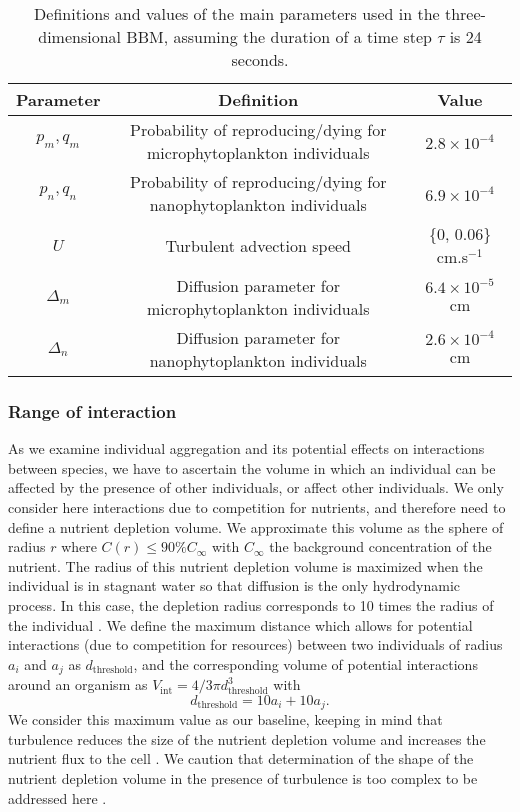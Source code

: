 \documentclass[12pt,english]{article}
\providecommand{\tabularnewline}{\\}
\begin{document}
\begin{table}[H]
\begin{centering}
\begin{tabular}{|c|c|c|}
\hline 
Parameter  & Definition  & Value\tabularnewline
\hline 
$p_{m},q_{m}$  & Probability of reproducing/dying for microphytoplankton individuals  & $2.8\times10^{-4}$\tabularnewline
$p_{n},q_{n}$  & Probability of reproducing/dying for nanophytoplankton individuals  & $6.9\times10^{-4}$\tabularnewline
$U$  & Turbulent advection speed  & \{0, 0.06\} cm.s$^{-1}$\tabularnewline
$\Delta_{m}$  & Diffusion parameter for microphytoplankton individuals  & $6.4\times10^{-5}$ cm\tabularnewline
$\Delta_{n}$  & Diffusion parameter for nanophytoplankton individuals  & $2.6\times10^{-4}$ cm\tabularnewline
\hline 
\end{tabular}
\par\end{centering}
\caption{Definitions and values of the main parameters used in the three-dimensional
BBM, assuming the duration of a time step $\tau$ is 24 seconds. \label{tab:Definition-and-value}}
\end{table}


\subsubsection*{Range of interaction}

As we examine individual aggregation and its potential effects on
interactions between species, we have to ascertain the volume in which
an individual can be affected by the presence of other individuals,
or affect other individuals. We only consider here interactions due
to competition for nutrients, and therefore need to define a nutrient
depletion volume. We approximate this volume as the sphere of radius
$r$ where $C(r)\leq90\%C_{\infty}$ with $C_{\infty}$ the background
concentration of the nutrient. The radius of this nutrient depletion
volume is maximized when the individual is in stagnant water so that
diffusion is the only hydrodynamic process. In this case, the depletion
radius corresponds to 10 times the radius of the individual \citep{jumars_physical_1993,karp-boss_nutrient_1996}.
We define the maximum distance which allows for potential interactions
(due to competition for resources) between two individuals of radius
$a_{i}$ and $a_{j}$ as $d_{\text{threshold}}$, and the corresponding
volume of potential interactions around an organism as $V_{\text{int}}=4/3\pi d_{\text{threshold}}^{3}$
with 
\begin{equation}
d_{\text{threshold}}=10a_{i}+10a_{j}.\label{eq:distance_interaction}
\end{equation}
We consider this maximum value as our baseline, keeping in mind that
turbulence reduces the size of the nutrient depletion volume and increases
the nutrient flux to the cell \citep{arnott_artificially_2021}. We
caution that determination of the shape of the nutrient depletion
volume in the presence of turbulence is too complex to be addressed
here \citep{karp-boss_nutrient_1996}.
\end{document}
